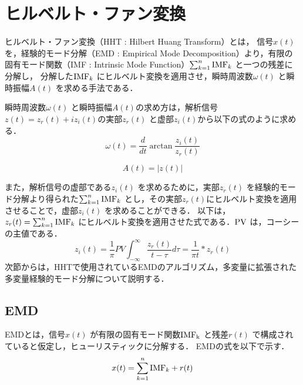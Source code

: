 \chapter{ヒルベルト・ファン変換}
%
ヒルベルト・ファン変換（HHT : Hilbert Huang Transform）とは，
信号$x(t)$ を，経験的モード分解（EMD : Empirical Mode Decomposition）より，有限の固有モード関数（IMF : Intrinsic Mode Function）$\sum_{k=1}^{n}{\rm{IMF}}_{k}$ と一つの残差に分解し，
分解した${\rm{IMF}}_{k}$ にヒルベルト変換を適用させ，瞬時周波数$\omega(t)$ と瞬時振幅$A(t)$ を求める手法である．
%

瞬時周波数$\omega(t)$ と瞬時振幅$A(t)$の求め方は，解析信号$z(t) = z_{r}(t) + iz_{i}(t)$の実部$z_{r}(t)$ と虚部$z_{i}(t)$から以下の式のように求める．
\begin{equation}
    \label{inst freq}
    \omega(t) = \frac{d}{dt}\arctan\frac{z_{i}(t)}{z_{r}(t)}
\end{equation}

\begin{equation}
    \label{inst amp}
    A(t) = |z(t)|
\end{equation}

また，解析信号の虚部である$z_{i}(t)$ を求めるために，実部$z_{r}(t)$ を経験的モード分解より得られた$\sum_{k=1}^{n}{\rm{IMF}}_{k}$ とし，その実部$z_{r}(t)$にヒルベルト変換を適用させることで，虚部$z_{i}(t)$ を求めることができる．
以下は，$z_{r}(t) = \sum_{k=1}^{n}{\rm{IMF}}_{k}$ にヒルベルト変換を適用させた式である．$\rm{PV}$ は，コーシーの主値である．
\begin{equation}
    z_{i}(t) = \frac{1}{\pi}PV \int_{-\infty}^{\infty} \frac{z_{r}(t)}{t - \tau} d \tau = \frac{1}{\pi t} * z_{r}(t)
\end{equation}
次節からは，HHTで使用されているEMDのアルゴリズム，多変量に拡張された多変量経験的モード分解について説明する．
%

\section{EMD}
%
EMDとは，信号$x(t)$ が有限の固有モード関数$\rm{IMF}_{k}$ と残差$r(t)$ で構成されていると仮定し，ヒューリスティックに分解する．
EMDの式を以下で示す．
\begin{equation}
    \label{emd}
    x(t) = \sum_{k=1}^{n} {\rm{IMF}}_{k} + r(t)
\end{equation}

